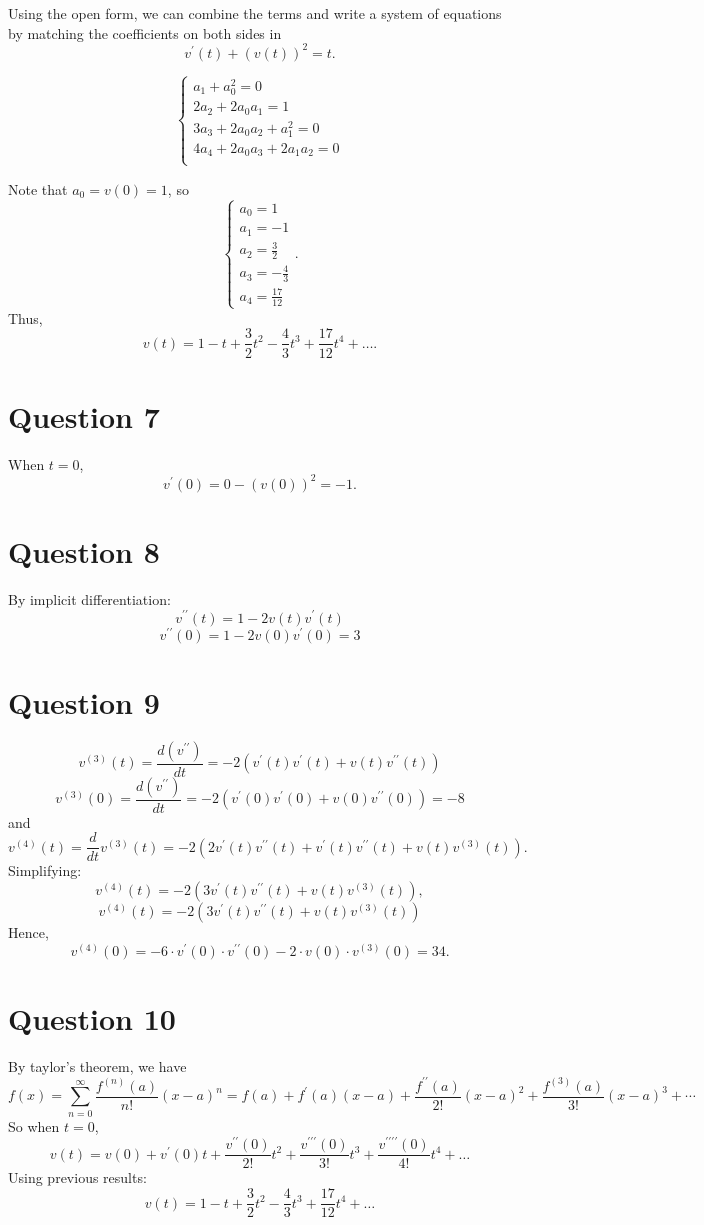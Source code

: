 \documentclass[12pt,a4paper]{article}
\begin{document}
Using the open form, we can combine the terms and write a system of equations by matching the coefficients on both sides in
\[
v^\prime (t) + (v(t))^2 = t.
\]

\[
\begin{cases}
a_1 + a_0^2 = 0\\
2a_2 + 2a_0a_1 = 1\\
3a_3+ 2a_0a_2 + a_1^2 = 0\\
4a_4 + 2a_0a_3 + 2a_1a_2 = 0\\
\end{cases}
\]

Note that $a_0=v(0)=1$, so
\[
\begin{cases}
a_0=1\\
a_1 = -1\\
a_2 = \frac{3}{2}\\
a_3 = -\frac{4}{3}\\
a_4 = \frac{17}{12}
\end{cases}.
\]
Thus, 
\[
v(t) = 1 - t + \frac{3}{2}t^2 -\frac{4}{3}t^3 + \frac{17}{12}t^4+\ldots.
\]

\section*{Question 7}
When $t=0$,
\[
v^\prime (0)  = 0 - (v(0))^2 = -1.
\]
\section*{Question 8}
By implicit differentiation:
\[
v^{\prime \prime}(t)=1-2 v(t) v^{\prime}(t)
\]
\[
v^{\prime \prime}(0)=1-2 v(0) v^{\prime}(0) = 3
\]

\section*{Question 9}
\[
v^{(3)}(t)=\frac{d(v^{\prime \prime})}{dt} = -2\left(v^{\prime}(t) v^{\prime}(t)+v(t) v^{\prime \prime}(t)\right)
\]
\[
v^{(3)}(0)=\frac{d(v^{\prime \prime})}{dt} = -2\left(v^{\prime}(0) v^{\prime}(0)+v(0) v^{\prime \prime}(0)\right)
=-8
\]
and
\[
v^{(4)}(t)=\frac{d}{d t} v^{(3)}(t)=-2\left(2 v^{\prime}(t) v^{\prime \prime}(t)+v^{\prime}(t) v^{\prime \prime}(t)+v(t) v^{(3)}(t)\right).
\]
Simplifying:
\[
v^{(4)}(t)=-2\left(3 v^{\prime}(t) v^{\prime \prime}(t)+v(t) v^{(3)}(t)\right),
\]
\[
v^{(4)}(t)=-2\left(3 v^{\prime}(t) v^{\prime \prime}(t)+v(t) v^{(3)}(t)\right)
\]
Hence,
\[
v^{(4)}(0)=-6 \cdot v^{\prime}(0) \cdot v^{\prime \prime}(0)-2 \cdot v(0) \cdot v^{(3)}(0)
=34.
\]
\section*{Question 10}
By taylor's theorem, we have
\[
f(x)=\sum_{n=0}^{\infty} \frac{f^{(n)}(a)}{n!}(x-a)^n 
=
f(a)+f^{\prime}(a)(x-a)+\frac{f^{\prime \prime}(a)}{2!}(x-a)^2+\frac{f^{(3)}(a)}{3!}(x-a)^3+\cdots
\]
So when $t=0$,
\[
v(t)=v(0)+v^{\prime}(0) t+\frac{v^{\prime \prime}(0)}{2!} t^2+\frac{v^{\prime \prime \prime}(0)}{3!} t^3+\frac{v^{\prime \prime \prime \prime}(0)}{4!} t^4 +\ldots
\]
Using previous results:
\[
v(t)=1-t+\frac{3}{2} t^2-\frac{4}{3} t^3+\frac{17}{12} t^4+\ldots
\]
\end{document}
